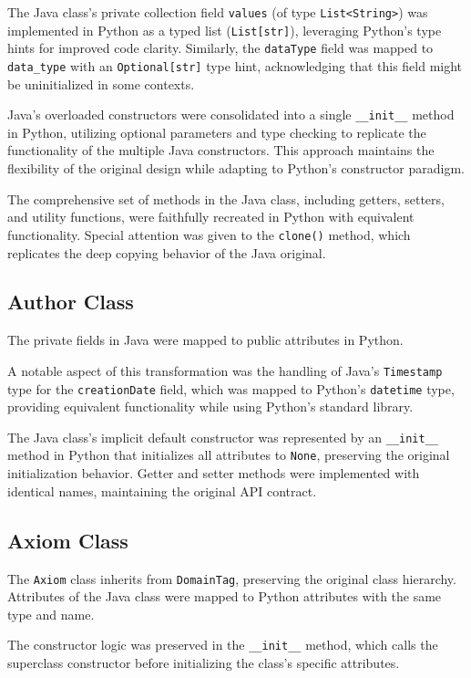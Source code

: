 \documentclass[12pt,a4paper]{article}
\begin{document}
The Java class's private collection field \texttt{values} (of type \texttt{List<String>}) was implemented in Python as a typed list (\texttt{List[str]}), leveraging Python's type hints for improved code clarity. Similarly, the \texttt{dataType} field was mapped to \texttt{data\_type} with an \texttt{Optional[str]} type hint, acknowledging that this field might be uninitialized in some contexts.

Java's overloaded constructors were consolidated into a single \texttt{\_\_init\_\_} method in Python, utilizing optional parameters and type checking to replicate the functionality of the multiple Java constructors. This approach maintains the flexibility of the original design while adapting to Python's constructor paradigm.

The comprehensive set of methods in the Java class, including getters, setters, and utility functions, were faithfully recreated in Python with equivalent functionality. Special attention was given to the \texttt{clone()} method, which replicates the deep copying behavior of the Java original.

\subsection{Author Class}
The private fields in Java were mapped to public attributes in Python.

A notable aspect of this transformation was the handling of Java's \texttt{Timestamp} type for the \texttt{creationDate} field, which was mapped to Python's \texttt{datetime} type, providing equivalent functionality while using Python's standard library.

The Java class's implicit default constructor was represented by an \texttt{\_\_init\_\_} method in Python that initializes all attributes to \texttt{None}, preserving the original initialization behavior. Getter and setter methods were implemented with identical names, maintaining the original API contract.

\subsection{Axiom Class}
The \texttt{Axiom} class inherits from \texttt{DomainTag}, preserving the original class hierarchy. Attributes of the Java class were mapped to Python attributes with the same type and name.

The constructor logic was preserved in the \texttt{\_\_init\_\_} method, which calls the superclass constructor before initializing the class's specific attributes.
\end{document}
